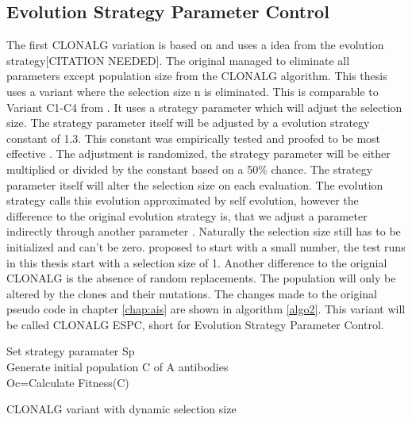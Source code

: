 \subsection{Evolution Strategy Parameter Control}
The first CLONALG variation is based on \cite{Garret04} and uses a idea from the evolution strategy[CITATION NEEDED]. The original managed to eliminate all parameters except population size from the CLONALG algorithm. This thesis uses a variant where the selection size n is eliminated. This is comparable to Variant C1-C4 from \cite{Garret04}. It uses a strategy parameter which will adjust the selection size. The strategy parameter itself will be adjusted by a evolution strategy constant of 1.3. This constant was empirically tested and proofed to be most effective \cite{Garret04}. The adjustment is randomized, the strategy parameter will be either multiplied or divided by the constant based on a 50\% chance. The strategy parameter itself will alter the selection size on each evaluation. The evolution strategy calls this evolution approximated by self evolution, however the difference to the original evolution strategy is, that we adjust a parameter indirectly through another parameter \cite{Garret04}. Naturally the selection size still has to be initialized and can't be zero. \cite{Garret04} proposed to start with a small number, the test runs in this thesis start with a selection size of 1. Another difference to the orignial CLONALG is the absence of random replacements. The population will only be altered by the clones and their mutations. The changes made to the original pseudo code in chapter \ref{chap:ais} are shown in algorithm \ref{algo2}. This variant will be called CLONALG ESPC, short for Evolution Strategy Parameter Control.
\begin{algorithm}[H]
	Set strategy paramater Sp\\
	Generate initial population C of A antibodies\\
	Oc=Calculate Fitness(C)\\
	\caption{CLONALG variant with dynamic selection size}
	\label{algo2}
\end{algorithm}
